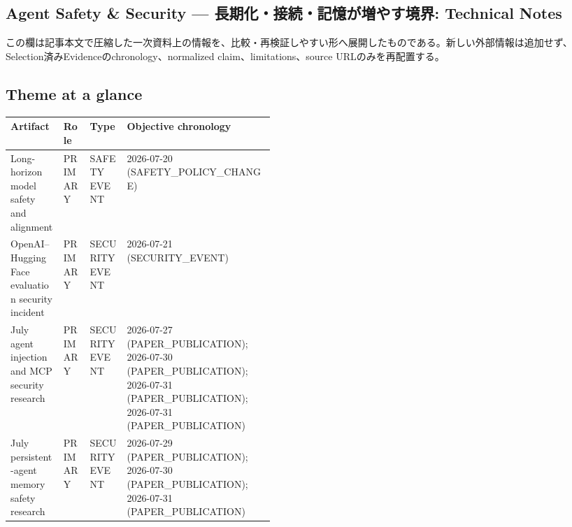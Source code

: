 \clearpage
{}
\subsection*{Agent Safety \& Security — 長期化・接続・記憶が増やす境界: Technical Notes}
この欄は記事本文で圧縮した一次資料上の情報を、比較・再検証しやすい形へ展開したものである。新しい外部情報は追加せず、Selection済みEvidenceのchronology、normalized claim、limitations、source URLのみを再配置する。
\medskip
\subsection*{Theme at a glance}
\begin{center}
\footnotesize
\begin{tabularx}{\linewidth}{@{}p{0.20\linewidth}p{0.10\linewidth}p{0.14\linewidth}X@{}}
\toprule
Artifact & Role & Type & Objective chronology \\
\midrule
Long-horizon model safety and alignment & PRIMARY & SAFETY EVENT & 2026-07-20 (SAFETY\_POLICY\_CHANGE) \\
OpenAI–Hugging Face evaluation security incident & PRIMARY & SECURITY EVENT & 2026-07-21 (SECURITY\_EVENT) \\
July agent injection and MCP security research & PRIMARY & SECURITY EVENT & 2026-07-27 (PAPER\_PUBLICATION); 2026-07-30 (PAPER\_PUBLICATION); 2026-07-31 (PAPER\_PUBLICATION); 2026-07-31 (PAPER\_PUBLICATION) \\
July persistent-agent memory safety research & PRIMARY & SECURITY EVENT & 2026-07-29 (PAPER\_PUBLICATION); 2026-07-30 (PAPER\_PUBLICATION); 2026-07-31 (PAPER\_PUBLICATION) \\
\bottomrule
\end{tabularx}
\end{center}
\normalsize

